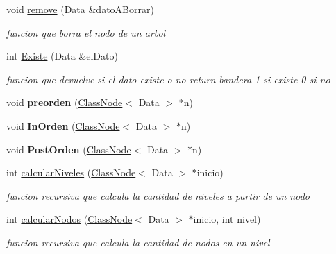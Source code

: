 \begin{DoxyCompactItemize}
\mbox{\label{class_binary_search_tree_a00b5c4aef3fae5ec348363e29e8b5cbf}} 
void \hyperlink{class_binary_search_tree_a00b5c4aef3fae5ec348363e29e8b5cbf}{remove} (Data \&dato\+A\+Borrar)
\begin{DoxyCompactList}\small\item\em funcion que borra el nodo de un arbol \end{DoxyCompactList}\item 
\mbox{\label{class_binary_search_tree_a6c83485425575c196701ca5e28d7f0e6}} 
int \hyperlink{class_binary_search_tree_a6c83485425575c196701ca5e28d7f0e6}{Existe} (Data \&el\+Dato)
\begin{DoxyCompactList}\small\item\em funcion que devuelve si el dato existe o no return bandera 1 si existe 0 si no \end{DoxyCompactList}\item 
\mbox{\label{class_binary_search_tree_ad1ef774f107b357863b1b578d0723553}} 
void {\bfseries preorden} (\hyperlink{class_class_node}{Class\+Node}$<$ Data $>$ $\ast$n)
\item 
\mbox{\label{class_binary_search_tree_a957d1cd0c14f897c4847753ce82a41d7}} 
void {\bfseries In\+Orden} (\hyperlink{class_class_node}{Class\+Node}$<$ Data $>$ $\ast$n)
\item 
\mbox{\label{class_binary_search_tree_a2119d18706ac114900c67d828c7ad476}} 
void {\bfseries Post\+Orden} (\hyperlink{class_class_node}{Class\+Node}$<$ Data $>$ $\ast$n)
\item 
int \hyperlink{class_binary_search_tree_a922ad2464f2085d208847a76fca1bb51}{calcular\+Niveles} (\hyperlink{class_class_node}{Class\+Node}$<$ Data $>$ $\ast$inicio)
\begin{DoxyCompactList}\small\item\em funcion recursiva que calcula la cantidad de niveles a partir de un nodo \end{DoxyCompactList}\item 
int \hyperlink{class_binary_search_tree_adb25fc678a13dbaa05ba0c0627eb232e}{calcular\+Nodos} (\hyperlink{class_class_node}{Class\+Node}$<$ Data $>$ $\ast$inicio, int nivel)
\begin{DoxyCompactList}\small\item\em funcion recursiva que calcula la cantidad de nodos en un nivel \end{DoxyCompactList}\item 

\end{DoxyCompactItemize}
